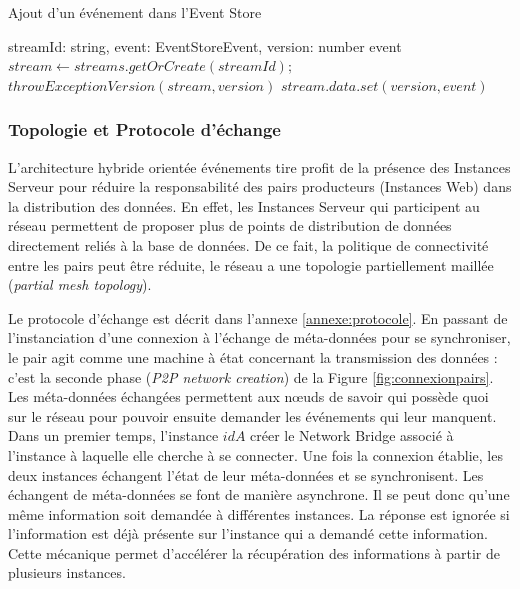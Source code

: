\begin{algorithm} %
	\caption{Ajout d'un événement dans l'Event Store} %
	\label{algo:addevent} %
	\begin{algorithmic} %
		\Require streamId: string, event: EventStoreEvent, version: number
		\Ensure event
		\State $stream \leftarrow streams.getOrCreate(streamId);$
		\State $throwExceptionVersion(stream,version)$
		\EndIf
		\State $stream.data.set(version,event) $
	\end{algorithmic}
\end{algorithm}

\subsubsection{Topologie et Protocole d'échange}
L'architecture hybride orientée \og événements\fg{} tire profit de la présence des 
Instances Serveur pour réduire la responsabilité des pairs producteurs (Instances 
Web) dans la distribution des données. En effet, les Instances Serveur qui 
participent au réseau permettent de proposer plus de points de distribution de 
données directement reliés à la base de données. De ce fait, la politique de 
connectivité entre les pairs peut être réduite, le réseau a une topologie 
partiellement maillée (\textit{partial mesh topology}). 

Le protocole d'échange est décrit dans l'annexe \ref{annexe:protocole}. En passant 
de l'instanciation d'une connexion à l'échange de méta-données pour se 
synchroniser, le pair agit comme une machine à état concernant la transmission 
des données : c'est la seconde phase (\textit{\gls{P2P} network creation}) de la 
Figure \ref{fig:connexionpairs}. Les 
méta-données échangées permettent aux n\oe uds de savoir \og qui possède 
quoi\fg{} sur le réseau pour pouvoir ensuite demander les événements qui leur 
manquent. 
Dans un premier temps, l'instance $idA$ créer le Network Bridge associé à 
l'instance à laquelle elle cherche à se connecter. Une fois la connexion établie, les 
deux instances échangent l'état de leur méta-données et se synchronisent. Les 
échangent de méta-données se font de manière asynchrone. Il se peut donc 
qu'une même information soit demandée à différentes instances. La réponse est 
ignorée si l'information est déjà présente sur l'instance qui a demandé cette 
information. Cette mécanique permet d'accélérer la récupération des informations 
à partir de plusieurs instances.

